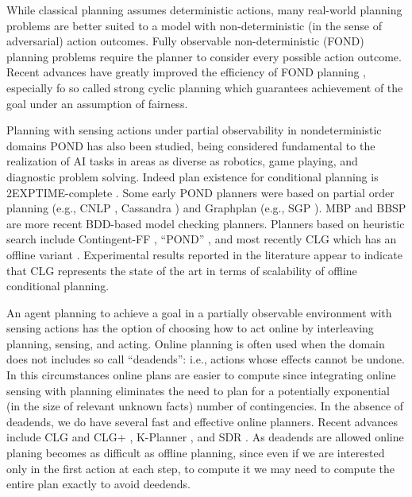 While classical planning assumes deterministic actions, many real-world planning problems are better suited to a model with non-deterministic (in the sense of adversarial) action outcomes. Fully observable non-deterministic (FOND) planning problems require the planner to consider every possible action outcome.  Recent advances have greatly improved the efficiency of FOND planning \cite{KuterNRG08,DMattmullerOHB10,FuNBY11,KissmannE11,MuiseMB12}, especially fo so called strong cyclic planning which guarantees achievement of the goal under an assumption of fairness. 

Planning with sensing actions under partial observability in nondeterministic domains POND has also been studied, being considered fundamental to the realization of AI tasks in areas as diverse as robotics, game playing, and diagnostic problem solving. Indeed plan existence for conditional planning is 2EXPTIME-complete \cite{Rintanen04icaps}. Some early POND planners were based on partial order planning (e.g., CNLP \cite{peot:92}, Cassandra \cite{collins:jair}) and Graphplan (e.g., SGP \cite{anderson:conditional}). MBP \cite{bertoli:mbp} and BBSP \cite{Rintanen04aaai} are more recent BDD-based model checking planners. Planners based on heuristic search include Contingent-FF \cite{HoffmannB06}, ``POND'' \cite{BryceKS06}, and most recently CLG which has an offline variant \cite{AlborePG09,AlboreRG11,BonetG14}.  Experimental results reported in the literature appear to indicate that CLG represents the state of the art in terms of scalability of offline conditional planning.



An agent planning to achieve a goal in a partially observable environment with sensing actions has the option of choosing how to act online by interleaving planning, sensing, and acting.  Online planning is often used  when the domain does not includes so call ``deadends'': i.e., actions whose effects cannot be undone.  In this circumstances online plans are easier to compute since integrating online sensing with planning eliminates the need to plan for a potentially exponential (in the size of relevant unknown facts) number of contingencies. In the absence of deadends, we do have several fast and effective online planners. Recent advances include CLG and CLG+ \cite{AlborePG09,AlboreRG11}, K-Planner \cite{BonetG11,BonetG14}, and SDR \cite{BrafmanS16}.
As deadends are allowed online planing becomes as difficult as offline planning, since even if we are interested only in the first action at each step, to compute it we may need to compute the entire plan exactly to avoid deedends.



